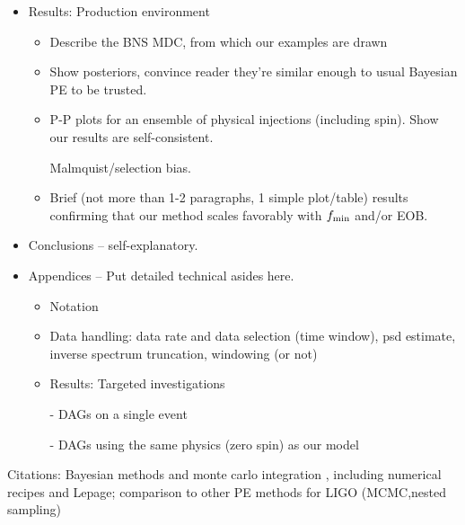 \documentclass[twocolumn,prd,nofootinbib]{revtex4}
\begin{document}
\begin{widetext}
\begin{itemize}
\begin{itemize}
	\end{itemize}

\item Results: Production environment
	\begin{itemize}
          \item Describe the BNS MDC, from which our examples are drawn
	\item Show posteriors, convince reader they're similar enough to usual Bayesian PE to be trusted.
	\item P-P plots for an ensemble of physical injections (including spin). Show our results are self-consistent.

          Malmquist/selection bias.  
	\item Brief (not more than 1-2 paragraphs, 1 simple plot/table) results confirming 
		that our method scales favorably with $f_{\rm min}$ and/or EOB. 
	\end{itemize}

\item Conclusions -- self-explanatory.

\item Appendices -- Put detailed technical asides here.

  \begin{itemize}
    \item Notation
    \item Data handling: data rate and data selection (time window), psd estimate, inverse spectrum truncation,
      windowing (or not)
  \item Results: Targeted investigations

  -    DAGs on a single event

  - DAGs using the same physics (zero spin) as our model

  \end{itemize}

\end{itemize}

Citations: Bayesian methods and monte carlo integration \cite{2011RvMP...83..943V}, including numerical recipes and Lepage; comparison
to other PE methods for LIGO
(MCMC,nested sampling) \cite{LIGO-CBC-S6-PE,2011PhRvD..83h2002D,2011PhRvD..84f2003C,gr-extensions-tests-Europeans2011,gwastro-mergers-PE-Aylott-LIGOATest,2011ApJ...739...99N,2012PhRvD..85j4045V,gw-astro-PE-Raymond,gw-astro-PE-lalinference-v1}

\tableofcontents

\end{widetext}
\end{document}
